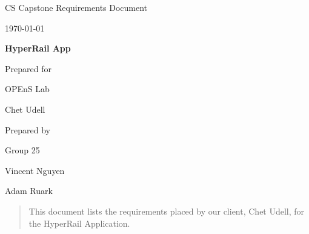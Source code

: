 \documentclass[onecolumn, draftclsnofoot,10pt, compsoc]{IEEEtran}
\def \CapstoneTeamName{		    Team 25}
\def \CapstoneTeamNumber{		25}
\def \GroupMemberOne{			Vincent Nguyen}
\def \GroupMemberTwo{			Adam Ruark}
\def \CapstoneProjectName{		HyperRail App}
\def \CapstoneSponsorCompany{	OPEnS Lab}
\def \CapstoneSponsorPerson{	Chet Udell}
\def \DocType{	%
				Requirements Document
				}
\newcommand{\NameSigPair}[1]{\par
\makebox[2.75in][r]{#1} \hfil 	\makebox[3.25in]{\makebox[2.25in]{\hrulefill} \hfill		\makebox[.75in]{\hrulefill}}
\par\vspace{-12pt} \textit{\tiny\noindent
\makebox[2.75in]{} \hfil		\makebox[3.25in]{\makebox[2.25in][r]{Signature} \hfill	\makebox[.75in][r]{Date}}}}
\renewcommand{\NameSigPair}[1]{#1}
\begin{document}
\begin{titlepage}
    \begin{singlespace}
        \hfill 
        \par\vspace{.2in}
        \centering
        \scshape{
            \huge CS Capstone \DocType \par
            {\large\today}\par
            \vspace{.5in}
            \textbf{\Huge\CapstoneProjectName}\par
            \vfill
            {\large Prepared for}\par
            \Huge \CapstoneSponsorCompany\par
            \vspace{5pt}
            {\Large\NameSigPair{\CapstoneSponsorPerson}\par}
            {\large Prepared by }\par
            Group\CapstoneTeamNumber\par
            \vspace{5pt}
            {\Large
                \NameSigPair{\GroupMemberOne}\par
                \NameSigPair{\GroupMemberTwo}\par
            }
            \vspace{20pt}
        }
        \begin{abstract}
        This document lists the requirements placed by our client, Chet Udell, for the HyperRail Application.
        
        \end{abstract}     
    \end{singlespace}
\end{titlepage}
\newpage
{}
\tableofcontents

\clearpage

\end{document}
